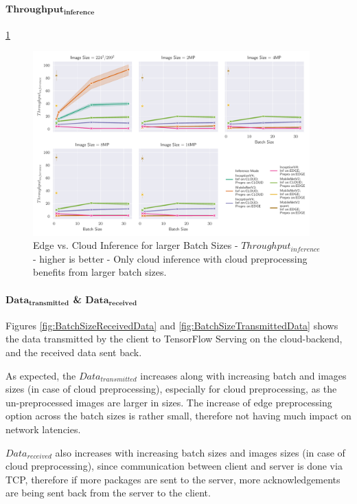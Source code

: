\paragraph{$\mathbf{Throughput_{inference}}$}
\ref{fig:BatchSizeInferenceThroughput}
\begin{figure}[!htb]
\centering
\includegraphics[width=0.95\textwidth]{./Bilder/single_plots/batch_size_plots/Effects_of_Batch_size_Inference_Throughput.pdf}
\caption{Edge vs. Cloud Inference for larger Batch Sizes -  $Throughput_{inference}$ - higher is better - Only cloud inference with cloud preprocessing benefits from larger batch sizes.}
\label{fig:BatchSizeInferenceThroughput}
\end{figure}

\paragraph{$\mathbf{Data_{transmitted}}$ \& $\mathbf{Data_{received}}$}
Figures \ref{fig:BatchSizeReceivedData} and \ref{fig:BatchSizeTransmittedData} shows the data transmitted by the client to TensorFlow Serving on the cloud-backend, and the received data sent back.

As expected, the $Data_{transmitted}$ increases along with increasing batch and images sizes (in case of cloud preprocessing), especially for cloud preprocessing, as the un-preprocessed images are larger in sizes.
The increase of edge preprocessing option across the batch sizes is rather small, therefore not having much impact on network latencies.

$Data_{received}$ also increases with increasing batch sizes and images sizes (in case of cloud preprocessing), since communication between client and server is done via TCP, therefore if more packages are sent to the server, more acknowledgements are being sent back from the server to the client.


